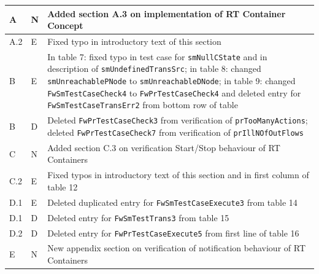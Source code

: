 \documentclass[a4paper,10pt]{article}
\begin{document}
\begin{longtable}{|p{1.5cm}|p{1cm}|p{8cm}|}
\hline
A & N & Added section A.3 on implementation of RT Container Concept \\
\hline
A.2 & E & Fixed typo in introductory text of this section \\
\hline
B & E & In table 7: fixed typo in test case for \texttt{smNullCState} and in description of \texttt{smUndefinedTransSrc}; in table 8: changed \texttt{smUnreachablePNode} to \texttt{smUnreachableDNode}; in table 9: changed \texttt{FwSmTestCaseCheck4} to \texttt{FwPrTestCaseCheck4} and deleted entry for \texttt{FwSmTestCaseTransErr2} from bottom row of table \\
\hline
B & D & Deleted \texttt{FwPrTestCaseCheck3} from verification of \texttt{prTooManyActions}; deleted \texttt{FwPrTestCaseCheck7} from verification of \texttt{prIllNOfOutFlows} \\
\hline
C & N & Added section C.3 on verification Start/Stop behaviour of RT Containers \\
\hline
C.2 & E & Fixed typos in introductory text of this section and in first column of table 12\\
\hline
D.1 & E & Deleted duplicated entry for \texttt{FwSmTestCaseExecute3} from table 14 \\
\hline
D.1 & D & Deleted entry for \texttt{FwSmTestTrans3} from table 15 \\
\hline
D.2 & D & Deleted entry for \texttt{FwPrTestCaseExecute5} from first line of table 16 \\
\hline
E & N & New appendix section on verification of notification behaviour of RT Containers\\
\hline
\end{longtable}

\newpage
\end{document}
